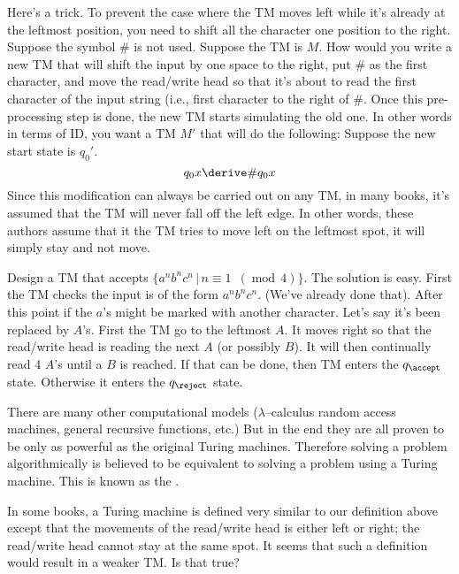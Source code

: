 \begin{eg} Here's a trick. To prevent the case where the TM moves
left while it's already at the leftmost position, you need to
shift all the character one position to the right. Suppose the
symbol $\#$ is not used. Suppose the TM is $M$. How would you
write a new TM that will shift the input by one space to the
right, put $\#$ as the first character, and move the read/write
head so that it's about to read the first character of the input
string (i.e., first character to the right of $\#$. Once this
pre-processing step is done, the new TM starts simulating the old
one. In other words in terms of ID, you want a TM $M'$ that will
do the following: Suppose the new start state is $q_0'$.
\[
 q_0x \derive \#q_0x
\]
Since this modification can always be carried out on any TM, in
many books, it's assumed that the TM will never fall off the left
edge. In other words, these authors assume that it the TM tries to
move left on the leftmost spot, it will simply stay and not move.
\end{eg}

\begin{eg}
Design a TM that accepts $\{a^nb^nc^n \,|\, n \equiv 1
\,\,\,(\operatorname{mod} \, 4)\}$. The solution is easy. First
the TM checks the input is of the form $a^nb^nc^n$. (We've already
done that). After this point if the $a$'s might be marked with
another character. Let's say it's been replaced by $A$'s. First
the TM go to the leftmost $A$. It moves right so that the
read/write head is reading the next $A$ (or possibly $B$). It will
then continually read 4 $A$'s until a $B$ is reached. If that can
be done, then TM enters the $q_{\accept}$ state. Otherwise it
enters the $q_{\reject}$ state.
\end{eg}


There are many other computational models ($\lambda$--calculus
random access machines, general recursive functions, etc.) But in
the end they are all proven to be only as powerful as the original
Turing machines. Therefore solving a problem algorithmically is
believed to be equivalent to solving a problem using a Turing
machine. This is known as the
.

\begin{eg}
In some books, a Turing machine is defined very similar to our
definition above except that the movements of the read/write head
is either left or right; the read/write head cannot stay at the
same spot. It seems that such a definition would result in a
weaker TM. Is that true?
\end{eg}

